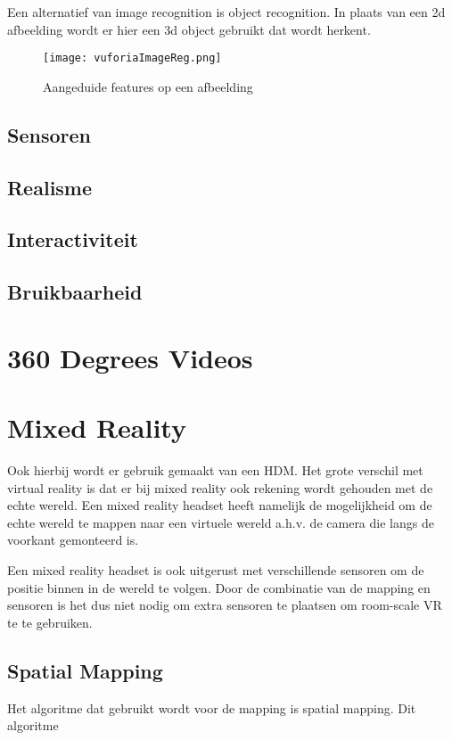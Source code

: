Een alternatief van image recognition is object recognition. In plaats van een 2d afbeelding wordt er hier een 3d object gebruikt dat wordt herkent.

\begin{figure}
    \texttt{[image: vuforiaImageReg.png]}
    \caption{Aangeduide features op een afbeelding}
    \label{fig:imagereg}
\end{figure}

\subsection{Sensoren}
\subsection{Realisme}
\subsection{Interactiviteit}
\subsection{Bruikbaarheid}
\section{360 Degrees Videos}
\section{Mixed Reality} \label{sec:mixedreality}
Ook hierbij wordt er gebruik gemaakt van een HDM. Het grote verschil met virtual reality is dat er bij mixed reality ook rekening wordt gehouden met de echte wereld. Een mixed reality headset heeft namelijk de mogelijkheid om de echte wereld te mappen naar een virtuele wereld a.h.v. de camera die langs de voorkant gemonteerd is.

Een mixed reality headset is ook uitgerust met verschillende sensoren om de positie binnen in de wereld te volgen. Door de combinatie van de mapping en sensoren is het dus niet nodig om extra sensoren te plaatsen om room-scale VR te te gebruiken.
\subsection{Spatial Mapping}
Het algoritme dat gebruikt wordt voor de mapping is spatial mapping. Dit algoritme %

